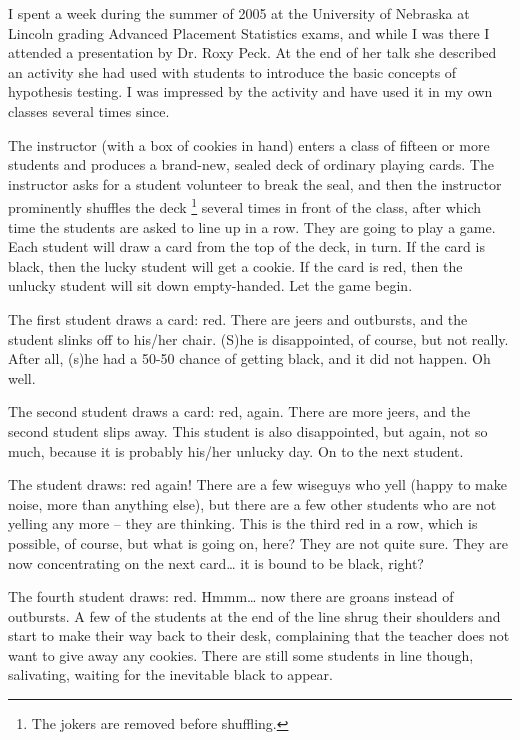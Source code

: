 \documentclass[captions=tableheading]{scrbook}
\begin{document}
\label{sec:Introduction-Hypothesis}

I spent a week during the summer of 2005 at the University of Nebraska at Lincoln grading Advanced Placement Statistics exams, and while I was there I attended a presentation by Dr. Roxy Peck. At the end of her talk she described an activity she had used with students to introduce the basic concepts of hypothesis testing. I was impressed by the activity and have used it in my own classes several times since.

The instructor (with a box of cookies in hand) enters a class of fifteen or more students and produces a brand-new, sealed deck of ordinary playing cards. The instructor asks for a student volunteer to break the seal, and then the instructor prominently shuffles the deck
\footnote{The jokers are removed before shuffling.}
several times in front of the class, after which time the students are asked to line up in a row. They are going to play a game. Each student will draw a card from the top of the deck, in turn. If the card is black, then the lucky student will get a cookie. If the card is red, then the unlucky student will sit down empty-handed. Let the game begin.

The first student draws a card: red. There are jeers and outbursts, and the student slinks off to his/her chair. (S)he is disappointed, of course, but not really. After all, (s)he had a 50-50 chance of getting black, and it did not happen. Oh well.

The second student draws a card: red, again. There are more jeers, and the second student slips away. This student is also disappointed, but again, not so much, because it is probably his/her unlucky day. On to the next student.

The student draws: red again! There are a few wiseguys who yell (happy to make noise, more than anything else), but there are a few other students who are not yelling any more -- they are thinking. This is the third red in a row, which is possible, of course, but what is going on, here? They are not quite sure. They are now concentrating on the next card\ldots{} it is bound to be black, right?

The fourth student draws: red. Hmmm\ldots{} now there are groans instead of outbursts. A few of the students at the end of the line shrug their shoulders and start to make their way back to their desk, complaining that the teacher does not want to give away any cookies. There are still some students in line though, salivating, waiting for the inevitable black to appear.
\end{document}
